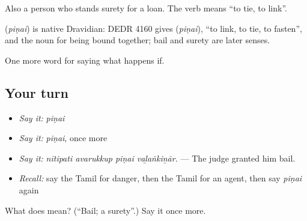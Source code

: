 Also a person who stands surety for a loan. The verb  means \textquotedblleft{}to tie, to link\textquotedblright{}.

\begin{cousinweb}
\textbf{} (\emph{piṇai}) is native Dravidian: DEDR 4160 gives  (\emph{piṇai}), \textquotedblleft{}to link, to tie, to fasten\textquotedblright{}, and the noun for being bound together; bail and surety are later senses.
\end{cousinweb}

\begin{grammarlens}[title={What you've built}]
One more word for saying what happens if.
\end{grammarlens}

\subsection*{Your turn}
\begin{itemize}
\raggedright
  \item \emph{Say it:} \emph{piṇai}
  \item \emph{Say it:} \emph{piṇai}, once more
  \item \emph{Say it:} \emph{nītipati avarukkup piṇai vaḻaṅkiṉār.} — The judge granted him bail.
  \item \emph{Recall:} say the Tamil for danger, then the Tamil for an agent, then say \emph{piṇai} again
\end{itemize}

\begin{tcolorbox}[breakable,colback=teal!4,colframe=teal!35!black,title={Before you move on}]
What does  mean? (\textquotedblleft{}Bail; a surety\textquotedblright{}.) Say it once more.
\end{tcolorbox}
